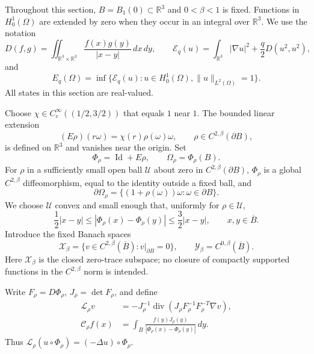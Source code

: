 \documentclass[11pt,a4paper]{article}
\theoremstyle{definition}
\theoremstyle{remark}
\begin{document}
Throughout this section, $B=B_1(0)\subset\mathbb R^3$ and
$0<\beta<1$ is fixed.  Functions in $H^1_0(\Omega)$ are extended by zero
when they occur in an integral over $\mathbb R^3$.  We use the notation
\[
 D(f,g)=\iint_{\mathbb R^3\times\mathbb R^3}
       \frac{f(x)g(y)}{|x-y|}\,dx\,dy,
 \qquad
 \mathcal E_q(u)=\int_{\mathbb R^3}|\nabla u|^2
                  +\frac q2D(u^2,u^2),
\]
and
\[
 E_q(\Omega)=\inf\{\mathcal E_q(u):u\in H^1_0(\Omega),
                              \|u\|_{L^2(\Omega)}=1\}.
\]
All states in this section are real-valued.

Choose $\chi\in C_c^\infty((1/2,3/2))$ that equals $1$ near $1$.
The bounded linear extension
\[
 (E\rho)(r\omega)=\chi(r)\rho(\omega)\omega,
 \qquad \rho\in C^{2,\beta}(\partial B),
\]
is defined on $\mathbb R^3$ and vanishes near the origin.  Set
\[
 \Phi_\rho=\operatorname{Id}+E\rho,
 \qquad \Omega_\rho=\Phi_\rho(B).
\]
For $\rho$ in a sufficiently small open ball $\mathcal U$ about zero in
$C^{2,\beta}(\partial B)$, $\Phi_\rho$ is a global $C^{2,\beta}$
diffeomorphism, equal to the identity outside a fixed ball, and
\[
 \partial\Omega_\rho
   =\{(1+\rho(\omega))\omega:\omega\in\partial B\}.
\]
We choose $\mathcal U$ convex and small enough that, uniformly for
$\rho\in\mathcal U$,
\begin{equation}
 \frac12|x-y|\leq|\Phi_\rho(x)-\Phi_\rho(y)|
                  \leq\frac32|x-y|,
 \qquad x,y\in\overline B.
 \label{eq:state-bilip}
\end{equation}
Introduce the fixed Banach spaces
\[
 \mathcal X_\beta=\{v\in C^{2,\beta}(\overline B):v|_{\partial B}=0\},
 \qquad \mathcal Y_\beta=C^{0,\beta}(\overline B).
\]
Here $\mathcal X_\beta$ is the closed zero-trace subspace; no closure of compactly
supported functions in the $C^{2,\beta}$ norm is intended.

Write $F_\rho=D\Phi_\rho$, $J_\rho=\det F_\rho$, and define
\begin{align}
 \mathcal L_\rho v
   &=-J_\rho^{-1}\operatorname{div}
       (J_\rho F_\rho^{-1}F_\rho^{-T}\nabla v),
       \label{eq:state-pullback-laplace}\\
 \mathcal C_\rho f(x)
   &=\int_B\frac{f(y)J_\rho(y)}
                      {|\Phi_\rho(x)-\Phi_\rho(y)|}\,dy.
       \label{eq:state-pullback-coulomb}
\end{align}
Thus $\mathcal L_\rho(u\circ\Phi_\rho)=(-\Delta u)\circ\Phi_\rho$.
\end{document}
